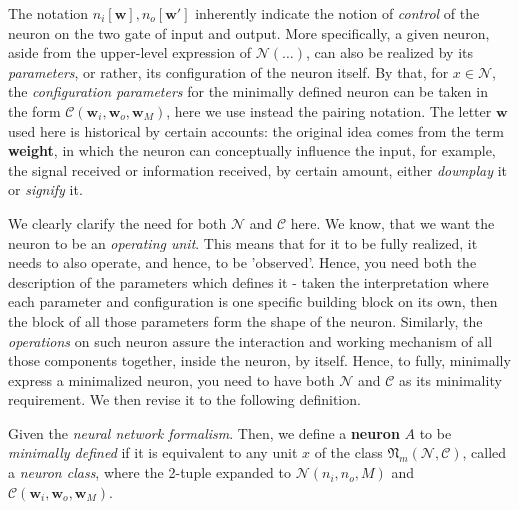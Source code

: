 The notation $n_{i}[\mathbf{w}], n_{o}[\mathbf{w}']$ inherently indicate the notion of \textit{control} of the neuron on the two gate of input and output. More specifically, a given neuron, aside from the upper-level expression of $\mathcal{N}(\dots)$, can also be realized by its \textit{parameters}, or rather, its configuration of the neuron itself. By that, for $x \in \mathcal{N}$, the \textit{configuration parameters} for the minimally defined neuron can be taken in the form $\mathcal{C}(\mathbf{w}_{i}, \mathbf{w}_{o}, \mathbf{w}_{M})$, here we use instead the pairing notation. The letter $\mathbf{w}$ used here is historical by certain accounts: the original idea comes from the term \textbf{weight}, in which the neuron can conceptually influence the input, for example, the signal received or information received, by certain amount, either \textit{downplay} it or \textit{signify} it.

We clearly clarify the need for both $\mathcal{N}$ and $\mathcal{C}$ here. We know, that we want the neuron to be an \textit{operating unit}. This means that for it to be fully realized, it needs to also operate, and hence, to be 'observed'. Hence, you need both the description of the parameters which defines it - taken the interpretation where each parameter and configuration is one specific building block on its own, then the block of all those parameters form the shape of the neuron. Similarly, the \textit{operations} on such neuron assure the interaction and working mechanism of all those components together, inside the neuron, by itself. Hence, to fully, minimally express a minimalized neuron, you need to have both $\mathcal{N}$  and $\mathcal{C}$ as its minimality requirement. We then revise it to the following definition. 

\begin{definition} \label{def:neuclass}
    Given the \textit{neural network formalism}. Then, we define a \textbf{neuron} $A$ to be \textit{minimally defined} if it is equivalent to any unit $x$ of the class $\mathfrak{N}_{m}(\mathcal{N}, \mathcal{C})$, called a \textit{neuron class}, where the 2-tuple expanded to $\mathcal{N}(n_{i}, n_{o}, M)$ and $\mathcal{C}(\mathbf{w}_{i}, \mathbf{w}_{o}, \mathbf{w}_{M})$. %
\end{definition}

